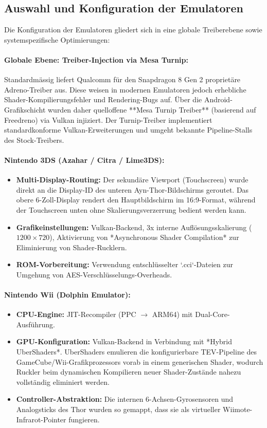 \documentclass[12pt,a4paper]{scrartcl}
\begin{document}
\subsection{Auswahl und Konfiguration der Emulatoren}
Die Konfiguration der Emulatoren gliedert sich in eine globale Treiberebene sowie systemspezifische Optimierungen:

\paragraph{Globale Ebene: Treiber-Injection via Mesa Turnip:}
Standardmässig liefert Qualcomm für den Snapdragon 8 Gen 2 proprietäre Adreno-Treiber aus. Diese weisen in modernen Emulatoren jedoch erhebliche Shader-Kompilierungsfehler und Rendering-Bugs auf. Über die Android-Grafikschicht wurden daher quelloffene **Mesa Turnip Treiber** (basierend auf Freedreno) via Vulkan injiziert. Der Turnip-Treiber implementiert standardkonforme Vulkan-Erweiterungen und umgeht bekannte Pipeline-Stalls des Stock-Treibers.

\paragraph{Nintendo 3DS (Azahar / Citra / Lime3DS):}
\begin{itemize}[leftmargin=1.8em]
    \item \textbf{Multi-Display-Routing:} Der sekundäre Viewport (Touchscreen) wurde direkt an die Display-ID des unteren Ayn-Thor-Bildschirms geroutet. Das obere 6-Zoll-Display rendert den Hauptbildschirm im 16:9-Format, während der Touchscreen unten ohne Skalierungsverzerrung bedient werden kann.
    \item \textbf{Grafikeinstellungen:} Vulkan-Backend, 3x interne Auflösungsskalierung ($1200\times720$), Aktivierung von *Asynchronous Shader Compilation* zur Eliminierung von Shader-Rucklern.
    \item \textbf{ROM-Vorbereitung:} Verwendung entschlüsselter `.cci`-Dateien zur Umgehung von AES-Verschlüsselungs-Overheads.
\end{itemize}

\paragraph{Nintendo Wii (Dolphin Emulator):}
\begin{itemize}[leftmargin=1.8em]
    \item \textbf{CPU-Engine:} JIT-Recompiler (PPC $\rightarrow$ ARM64) mit Dual-Core-Ausführung.
    \item \textbf{GPU-Konfiguration:} Vulkan-Backend in Verbindung mit *Hybrid UberShaders*. UberShaders emulieren die konfigurierbare TEV-Pipeline des GameCube/Wii-Grafikprozessors vorab in einem generischen Shader, wodurch Ruckler beim dynamischen Kompilieren neuer Shader-Zustände nahezu vollständig eliminiert werden.
    \item \textbf{Controller-Abstraktion:} Die internen 6-Achsen-Gyrosensoren und Analogsticks des Thor wurden so gemappt, dass sie als virtueller Wiimote-Infrarot-Pointer fungieren.
\end{itemize}
\end{document}
